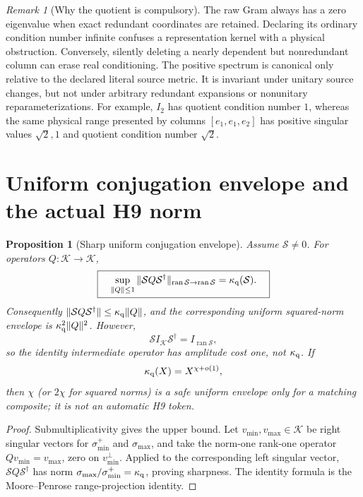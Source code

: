 \documentclass[11pt]{article}
\newtheorem{proposition}[theorem]{Proposition}
\theoremstyle{definition}
\theoremstyle{remark}
\newtheorem{remark}[theorem]{Remark}
\newcommand{\Syn}{\mathcal S}
\begin{document}
\begin{remark}[Why the quotient is compulsory]
The raw Gram always has a zero eigenvalue when exact redundant
coordinates are retained.  Declaring its ordinary condition number
infinite confuses a representation kernel with a physical
obstruction.  Conversely, silently deleting a nearly dependent but
nonredundant column can erase real conditioning.  The positive
spectrum is canonical only relative to the declared literal source
metric.  It is invariant under unitary source changes, but not under
arbitrary redundant expansions or nonunitary reparameterizations.
For example, \(I_2\) has quotient condition number \(1\), whereas
the same physical range presented by columns
\([e_1,e_1,e_2]\) has positive singular values
\(\sqrt2,1\) and quotient condition number \(\sqrt2\).
\end{remark}

\section{Uniform conjugation envelope and the actual H9 norm}

\begin{proposition}[Sharp uniform conjugation envelope]
\label{prop:square}
Assume \(\Syn\ne0\).  For operators
\(Q:\mathcal K\to\mathcal K\),
\[
 \boxed{\quad
 \sup_{\|Q\|\le1}
 \|\Syn Q\Syn^\dagger\|_{\operatorname{ran}\Syn\to
                         \operatorname{ran}\Syn}
 =\kappa_{\rm q}(\Syn).
 \quad}
\]
Consequently
\(\|\Syn Q\Syn^\dagger\|
\le\kappa_{\rm q}\|Q\|\), and the corresponding uniform squared-norm
envelope is \(\kappa_{\rm q}^2\|Q\|^2\).  However,
\[
 \Syn I_{\mathcal K}\Syn^\dagger
 =I_{\operatorname{ran}\Syn},
\]
so the identity intermediate operator has amplitude cost one, not
\(\kappa_{\rm q}\).  If
\[
 \kappa_{\rm q}(X)=X^{\chi+o(1)},
\]
then \(\chi\) (or \(2\chi\) for squared norms) is a safe uniform
envelope only for a matching composite; it is not an automatic H9
token.
\end{proposition}

\begin{proof}
Submultiplicativity gives the upper bound.  Let
\(v_{\min},v_{\max}\in\mathcal K\) be right singular vectors for
\(\sigma_{\min}^+\) and \(\sigma_{\max}\), and take the norm-one
rank-one operator \(Qv_{\min}=v_{\max}\), zero on
\(v_{\min}^\perp\).  Applied to the corresponding left singular
vector, \(\Syn Q\Syn^\dagger\) has norm
\(\sigma_{\max}/\sigma_{\min}^+=\kappa_{\rm q}\), proving sharpness.
The identity formula is the Moore--Penrose range-projection identity.
\end{proof}
\end{document}
